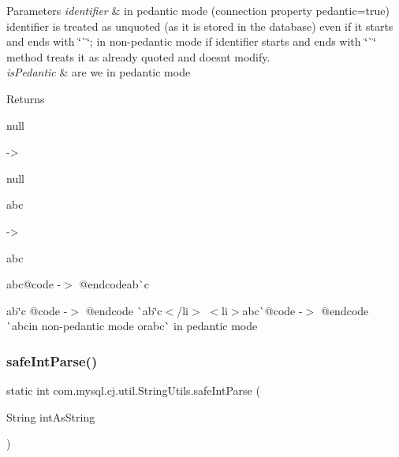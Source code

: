 \begin{DoxyParams}{Parameters}
{\em identifier} & in pedantic mode (connection property pedantic=true) identifier is treated as unquoted (as it is stored in the database) even if it starts and ends with \char`\"{}\`{}\char`\"{}; in non-\/pedantic mode if identifier starts and ends with \char`\"{}\`{}\char`\"{} method treats it as already quoted and doesn\textquotesingle{}t modify. \\
\hline
{\em is\+Pedantic} & are we in pedantic mode\\
\hline
\end{DoxyParams}
\begin{DoxyReturn}{Returns}

\begin{DoxyItemize}
\item null
\begin{DoxyCode}
-> 
\end{DoxyCode}
 null 
\item abc
\begin{DoxyCode}
-> 
\end{DoxyCode}
 {\ttfamily abc} 
\item ab{\ttfamily c@code -\/$>$ @endcode}ab\`{}{\ttfamily c} 
\item ab\char`\"{}c @code -\/$>$ @endcode  \`{}ab\char`\"{}c{\ttfamily $<$/li$>$ $<$li$>$}ab{\ttfamily c\`{}@code -\/$>$ @endcode \`{}ab}c{\ttfamily in non-\/pedantic mode or}{\ttfamily ab}{\ttfamily c}\`{} in pedantic mode 
\end{DoxyItemize}
\end{DoxyReturn}
\mbox{\label{classcom_1_1mysql_1_1cj_1_1util_1_1_string_utils_a424742b9ab9d0cf8e84eea0f13034f80}} 
\subsubsection{\texorpdfstring{safe\+Int\+Parse()}{safeIntParse()}}
{\footnotesize\ttfamily static int com.\+mysql.\+cj.\+util.\+String\+Utils.\+safe\+Int\+Parse (\begin{DoxyParamCaption}\item[{String}]{int\+As\+String }\end{DoxyParamCaption})\hspace{0.3cm}{\ttfamily [static]}}

